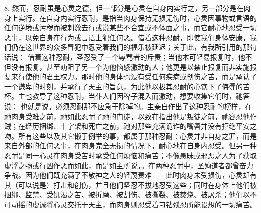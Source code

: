 8. 然而，忍耐虽是心灵之德，但一部分是心灵在自身内实行之，另一部分是在肉身上实行。在自身内实行忍耐，是指当肉身保持无损无伤时，心灵因事物或言语的任何逆境或污秽而被刺激去行或说某些不合宜或不体面之事，而它耐心地忍受一切恶事，以免自身在行为或言语上犯任何恶。借着这种忍耐，即使我们身体安康，我们仍在这世界的众多冒犯中忍受着我们的福乐被延迟；关于此，有我所引用的那句话说： 借着这种忍耐，圣忍受了一个辱骂者的斥责；当他本可轻易报复时，他不但没有报复，甚至劝阻了另一个为他恼怒激动的人；他更是以禁止报复而非实施报复来行使他的君王权力。那时他的身体也没有受任何疾病或创伤之苦，而是承认了一个谦卑的时刻，并承行了天主的旨意，为此他以极其忍耐的心饮下了侮辱的苦杯。主也教导了这种忍耐，当仆人们因稗子混入而激动，想要收集它们时，祂答说： 也就是说，必须忍耐那不应急于除掉的。主亲自作出了这种忍耐的榜样，在祂肉身受难之前，祂如此忍耐了祂的门徒，以致在指出他是叛徒之前，祂容忍他作贼；在经历捆绑、十字架和死亡之前，祂对那些充满诡诈的嘴唇并没有拒绝平安之吻。所有这些以及其它懒于例举的事，都属于那种忍耐：心灵并非自身之罪，而是来自外部的任何恶事，在肉身完全无损的情况下，耐心地在自身内忍受。但另一种忍耐是同一心灵在肉身受苦时承受任何烦恼和痛苦；不像愚昧或邪恶之人为了获取虚浮之物或行凶作恶而如此，而是如主所说，。在两种忍耐中，圣殉道者都曾奋力争战。因为他们既充满了不敬神之人的轻蔑责难——此时肉身未受损伤，心灵却有其（可以说是）打击和创伤，并且他们坚忍不拔地忍受这些；同时在身体上他们被捆绑、监禁、受饥渴之苦、被折磨、被割伤、被撕裂、被焚烧、被屠杀；他们以不可动摇的虔诚将心灵交托于天主，而肉身则忍受着刁钻残忍所能设想的一切痛苦。\par

